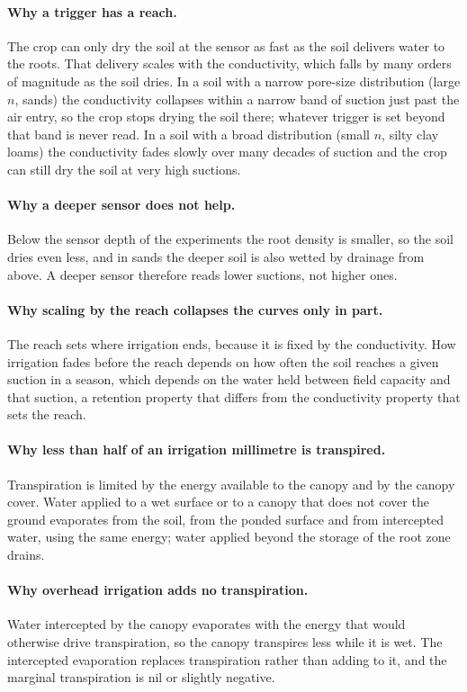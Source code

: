 \paragraph{Why a trigger has a reach.} The crop can only dry the soil at the sensor as fast as the soil delivers water to the roots. That delivery scales with the conductivity, which falls by many orders of magnitude as the soil dries. In a soil with a narrow pore-size distribution (large $n$, sands) the conductivity collapses within a narrow band of suction just past the air entry, so the crop stops drying the soil there; whatever trigger is set beyond that band is never read. In a soil with a broad distribution (small $n$, silty clay loams) the conductivity fades slowly over many decades of suction and the crop can still dry the soil at very high suctions.
\paragraph{Why a deeper sensor does not help.} Below the sensor depth of the experiments the root density is smaller, so the soil dries even less, and in sands the deeper soil is also wetted by drainage from above. A deeper sensor therefore reads lower suctions, not higher ones.
\paragraph{Why scaling by the reach collapses the curves only in part.} The reach sets where irrigation ends, because it is fixed by the conductivity. How irrigation fades before the reach depends on how often the soil reaches a given suction in a season, which depends on the water held between field capacity and that suction, a retention property that differs from the conductivity property that sets the reach.
\paragraph{Why less than half of an irrigation millimetre is transpired.} Transpiration is limited by the energy available to the canopy and by the canopy cover. Water applied to a wet surface or to a canopy that does not cover the ground evaporates from the soil, from the ponded surface and from intercepted water, using the same energy; water applied beyond the storage of the root zone drains.
\paragraph{Why overhead irrigation adds no transpiration.} Water intercepted by the canopy evaporates with the energy that would otherwise drive transpiration, so the canopy transpires less while it is wet. The intercepted evaporation replaces transpiration rather than adding to it, and the marginal transpiration is nil or slightly negative.

